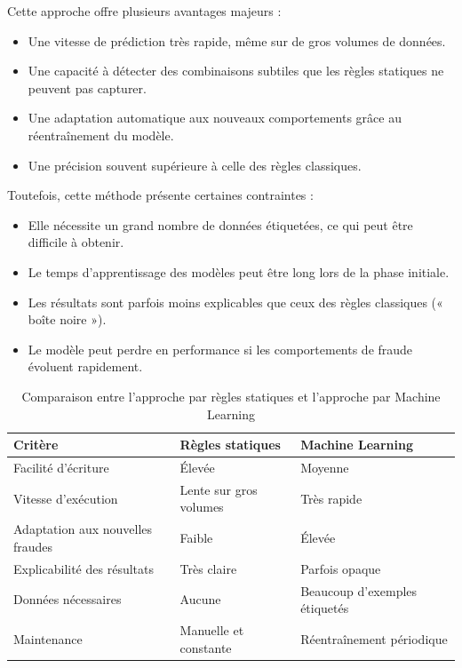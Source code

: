 \documentclass[12pt, oneside, a4paper]{report}
\begin{document}
\vspace{0.5cm}
Cette approche offre plusieurs avantages majeurs :
\begin{itemize}
\item Une vitesse de prédiction très rapide, même sur de gros volumes de données.
\item Une capacité à détecter des combinaisons subtiles que les règles statiques ne peuvent pas capturer.
\item Une adaptation automatique aux nouveaux comportements grâce au réentraînement du modèle.
\item Une précision souvent supérieure à celle des règles classiques.
\end{itemize}

Toutefois, cette méthode présente certaines contraintes :
\begin{itemize}
\item Elle nécessite un grand nombre de données étiquetées, ce qui peut être difficile à obtenir.
\item Le temps d'apprentissage des modèles peut être long lors de la phase initiale.
\item Les résultats sont parfois moins explicables que ceux des règles classiques (« boîte noire »).
\item Le modèle peut perdre en performance si les comportements de fraude évoluent rapidement.
\end{itemize}

\vspace{0.5cm}
\begin{table}[h!]
\centering
\caption{Comparaison entre l'approche par règles statiques et l'approche par Machine Learning}
\label{tab:approches}
\vspace{0.3cm}
\renewcommand{\arraystretch}{1.3}
\begin{tabular}{|l|l|l|}
\hline
\textbf{Critère} & \textbf{Règles statiques} & \textbf{Machine Learning} \\
\hline
Facilité d'écriture & Élevée & Moyenne \\
\hline
Vitesse d'exécution & Lente sur gros volumes & Très rapide \\
\hline
Adaptation aux nouvelles fraudes & Faible & Élevée \\
\hline
Explicabilité des résultats & Très claire & Parfois opaque \\
\hline
Données nécessaires & Aucune & Beaucoup d'exemples étiquetés \\
\hline
Maintenance & Manuelle et constante & Réentraînement périodique \\
\hline
\end{tabular}
\end{table}
\end{document}
